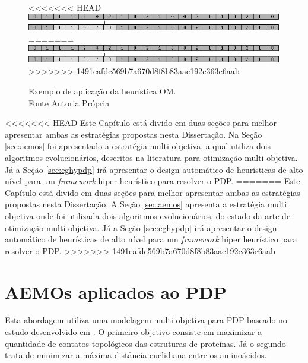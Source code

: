 \begin{itemize}
 	
 	\begin{figure}[!htb]
 		\centering
<<<<<<< HEAD
 		\includegraphics[scale=0.8]{Imagens/OppositeMutation.png}
=======
 		\includegraphics{Imagens/OppositeMutation.png}
>>>>>>> 1491eafdc569b7a670d8f8b83aae192c363e6aab
 		\caption{Exemplo de aplicação da heurística OM. \\Fonte Autoria Própria}
 		\label{fig:oppositeMutation}
 	\end{figure}
 	
 	
 	
 \end{itemize} 



<<<<<<< HEAD
 Este Capítulo está divido em duas seções para melhor apresentar ambas as estratégias propostas nesta Dissertação. Na Seção \ref{sec:aemos} foi apresentado a estratégia multi objetiva, a qual utiliza dois algoritmos evolucionários, descritos na literatura para otimização multi objetiva. Já a Seção  \ref{sec:eghypdp} irá apresentar o design automático de heurísticas de alto nível para um \textit{framework} hiper heurístico para resolver o PDP.
=======
 Este Capítulo está divido em duas seções para melhor apresentar ambas as estratégias propostas nesta Dissertação. A Seção \ref{sec:aemos} apresenta a estratégia multi objetiva onde foi utilizada dois algoritmos evolucionários, do estado da arte de otimização multi objetiva. Já a Seção  \ref{sec:eghypdp} irá apresentar o design automático de heurísticas de alto nível para um \textit{framework} hiper heurístico para resolver o PDP.
>>>>>>> 1491eafdc569b7a670d8f8b83aae192c363e6aab

	



\section{AEMOs aplicados ao PDP}
\label{sec:aeoms}

Esta abordagem utiliza uma modelagem multi-objetiva para PDP baseado no estudo desenvolvido em \cite{gabriel2012algoritmos}. O primeiro objetivo consiste em maximizar a quantidade de contatos topológicos das estruturas de proteínas. Já o segundo  trata de minimizar a máxima distância euclidiana entre os aminoácidos. 


